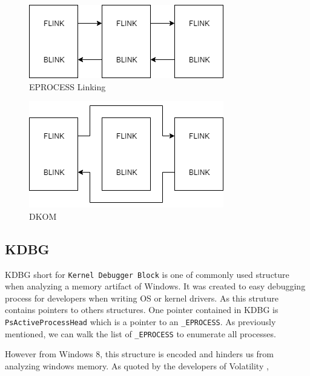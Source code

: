 \begin{figure}
\centering
\caption{EPROCESS Linking}
\label{fig:eprocesslink}
\includegraphics[]{images/eprocess_link.png}
\end{figure}

\begin{figure}
\centering
\caption{DKOM}
\label{fig:dkom}
\includegraphics[]{images/dkom.png}
\end{figure}

\subsection[KDBG]{KDBG}

KDBG short for \texttt{Kernel Debugger Block} is one of commonly used structure when analyzing a memory artifact of Windows. It was created to easy debugging process for developers when writing OS or kernel drivers. As this struture contains pointers to others structures. One pointer contained in KDBG is \texttt{PsActiveProcessHead} which is a pointer to an \texttt{\_EPROCESS}. As previously mentioned, we can walk the list of \texttt{\_EPROCESS} to enumerate all processes.

However from Windows 8, this structure is encoded and hinders us from analyzing windows memory. As quoted by the developers of Volatility \cite{kdbgEncoded},


